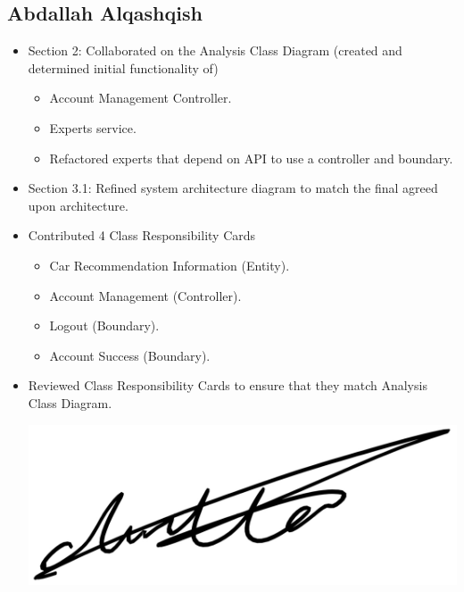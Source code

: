 \documentclass[]{article}
\begin{document}
\subsection{Abdallah Alqashqish}
\begin{itemize}
    \item Section 2: Collaborated on the Analysis Class Diagram (created and determined initial functionality of)
        \begin{itemize}
            \item Account Management Controller.
            \item Experts service.
            \item Refactored experts that depend on API to use a controller and boundary.
        \end{itemize}
    \item Section 3.1: Refined system architecture diagram to match the final agreed upon architecture.
    \item Contributed 4 Class Responsibility Cards
        \begin{itemize}
            \item Car Recommendation Information (Entity).
            \item Account Management (Controller).
            \item Logout (Boundary).
            \item Account Success (Boundary).
        \end{itemize}
    \item Reviewed Class Responsibility Cards to ensure that they match Analysis Class Diagram.
    \begin{center}
        \includegraphics[scale=0.1]{abdallah.jpg}
    \end{center}
\end{itemize}
\end{document}
